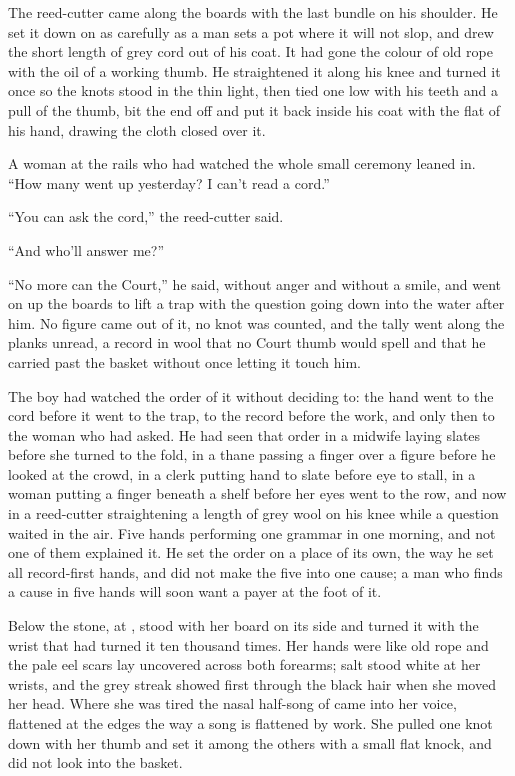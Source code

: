The reed-cutter came along the boards with the last bundle on his shoulder. He set it down on  as carefully as a man sets a pot where it will not slop, and drew the short length of grey cord out of his coat. It had gone the colour of old rope with the oil of a working thumb. He straightened it along his knee and turned it once so the knots stood in the thin light, then tied one low with his teeth and a pull of the thumb, bit the end off and put it back inside his coat with the flat of his hand, drawing the cloth closed over it.

A woman at the rails who had watched the whole small ceremony leaned in. “How many went up yesterday? I can't read a cord.”

“You can ask the cord,” the reed-cutter said.

“And who'll answer me?”

“No more can the Court,” he said, without anger and without a smile, and went on up the boards to lift a trap with the question going down into the water after him. No figure came out of it, no knot was counted, and the tally went along the planks unread, a record in wool that no Court thumb would spell and that he carried past the basket without once letting it touch him.

The boy had watched the order of it without deciding to: the hand went to the cord before it went to the trap, to the record before the work, and only then to the woman who had asked. He had seen that order in a midwife laying slates before she turned to the fold, in a thane passing a finger over a figure before he looked at the crowd, in a clerk putting hand to slate before eye to stall, in a woman putting a finger beneath a shelf before her eyes went to the row, and now in a reed-cutter straightening a length of grey wool on his knee while a question waited in the air. Five hands performing one grammar in one morning, and not one of them explained it. He set the order on a place of its own, the way he set all record-first hands, and did not make the five into one cause; a man who finds a cause in five hands will soon want a payer at the foot of it.

Below the stone, at ,  stood with her board on its side and turned it with the wrist that had turned it ten thousand times. Her hands were like old rope and the pale eel scars lay uncovered across both forearms; salt stood white at her wrists, and the grey streak showed first through the black hair when she moved her head. Where she was tired the nasal half-song of  came into her voice, flattened at the edges the way a song is flattened by work. She pulled one knot down with her thumb and set it among the others with a small flat knock, and did not look into the basket.

